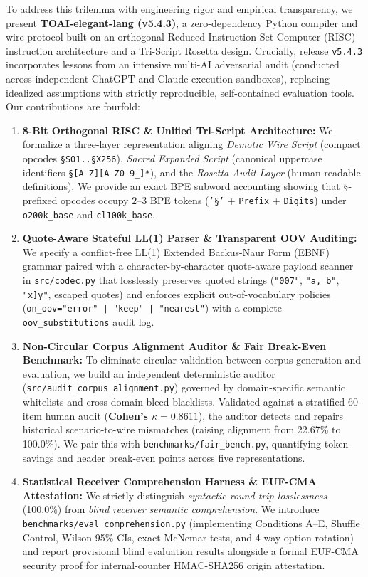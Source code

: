 \documentclass[9pt,a4paper]{extarticle}
\begin{document}
To address this trilemma with engineering rigor and empirical transparency, we present \textbf{TOAI-elegant-lang (v5.4.3)}, a zero-dependency Python compiler and wire protocol built on an orthogonal Reduced Instruction Set Computer (RISC) instruction architecture and a Tri-Script Rosetta design. Crucially, release \texttt{v5.4.3} incorporates lessons from an intensive multi-AI adversarial audit (conducted across independent ChatGPT and Claude execution sandboxes), replacing idealized assumptions with strictly reproducible, self-contained evaluation tools. Our contributions are fourfold:
\begin{enumerate}
  \item \textbf{8-Bit Orthogonal RISC \& Unified Tri-Script Architecture:} We formalize a three-layer representation aligning \emph{Demotic Wire Script} (compact opcodes \texttt{\S S01..\S X256}), \emph{Sacred Expanded Script} (canonical uppercase identifiers \texttt{\S[A-Z][A-Z0-9\_]*}), and the \emph{Rosetta Audit Layer} (human-readable definitions). We provide an exact BPE subword accounting showing that \texttt{\S}-prefixed opcodes occupy $2\text{--}3$ BPE tokens (\texttt{'\S'} + \texttt{Prefix} + \texttt{Digits}) under \texttt{o200k\_base} and \texttt{cl100k\_base}.
  \item \textbf{Quote-Aware Stateful LL(1) Parser \& Transparent OOV Auditing:} We specify a conflict-free LL(1) Extended Backus-Naur Form (EBNF) grammar paired with a character-by-character quote-aware payload scanner in \texttt{src/codec.py} that losslessly preserves quoted strings (\texttt{"007"}, \texttt{"a, b"}, \texttt{"x]y"}, escaped quotes) and enforces explicit out-of-vocabulary policies (\texttt{on\_oov="error" | "keep" | "nearest"}) with a complete \texttt{oov\_substitutions} audit log.
  \item \textbf{Non-Circular Corpus Alignment Auditor \& Fair Break-Even Benchmark:} To eliminate circular validation between corpus generation and evaluation, we build an independent deterministic auditor (\texttt{src/\allowbreak audit\_corpus\_\allowbreak alignment.py}) governed by domain-specific semantic whitelists and cross-domain bleed blacklists. Validated against a stratified 60-item human audit (\textbf{Cohen's $\kappa = 0.8611$}), the auditor detects and repairs historical scenario-to-wire mismatches (raising alignment from 22.67\% to 100.0\%). We pair this with \texttt{benchmarks/\allowbreak fair\_bench.py}, quantifying token savings and header break-even points across five representations.
  \item \textbf{Statistical Receiver Comprehension Harness \& EUF-CMA Attestation:} We strictly distinguish \emph{syntactic round-trip losslessness} (100.0\%) from \emph{blind receiver semantic comprehension}. We introduce \texttt{benchmarks/\allowbreak eval\_\allowbreak comprehension.py} (implementing Conditions A--E, Shuffle Control, Wilson 95\% CIs, exact McNemar tests, and 4-way option rotation) and report provisional blind evaluation results alongside a formal EUF-CMA security proof for internal-counter HMAC-SHA256 origin attestation.
\end{enumerate}
\end{document}
